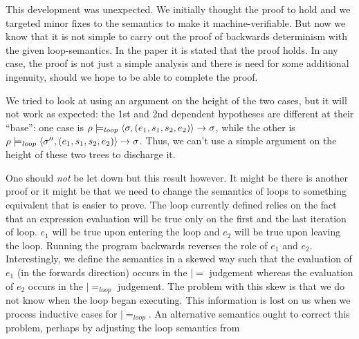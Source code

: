 This development was unexpected. We initially thought the proof to
hold and we targeted minor fixes to the semantics to make it
machine-verifiable. But now we know that it is not simple to carry out
the proof of backwards determinism with the given loop-semantics. In
the paper \cite{yokoyama.axelsen.ea:principles} it is stated that the
proof holds. In any case, the proof is not just a simple analysis and
there is need for some additional ingenuity, should we hope to be able
to complete the proof.

We tried to look at using an argument on the height of the two
cases, but it will not work as expected: the 1st and 2nd dependent
hypotheses are different at their ``base'': one case
is $\rho |=_{loop} \langle \sigma, (e_1, s_1, s_2, e_2) \rangle -> \sigma$,
while the other is $\rho |=_{loop} \langle \sigma'', (e_1, s_1, s_2,
  e_2) \rangle -> \sigma$. Thus, we can't use a simple argument on the height
of these two trees to discharge it.

One should \emph{not} be let down but this result however. It might be
there is another proof or it might be that we need to change the
semantics of loops to something equivalent that is easier to
prove. The loop currently defined relies on the fact that an
expression evaluation will be true only on the first and the last
iteration of loop. $e_1$ will be true upon entering the loop and $e_2$
will be true upon leaving the loop. Running the program backwards
reverses the role of $e_1$ and $e_2$. Interestingly, we define the
semantics in a skewed way such that the evaluation of $e_1$ (in the
forwards direction) occurs in the $|=$ judgement whereas the
evaluation of $e_2$ occurs in the $|=_{loop}$ judgement. The problem
with this skew is that we do not know when the loop began
executing. This information is lost on us when we process inductive
cases for $|=_{loop}$. An alternative semantics ought to correct this
problem, perhaps by adjusting the loop semantics from
\cite{yokoyama.gluck:reversible}


